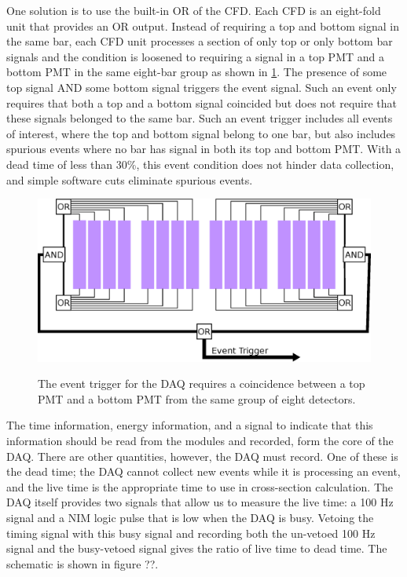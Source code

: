 One solution is to use the built-in OR of the CFD.  Each CFD is an eight-fold unit that provides an OR output.  Instead of requiring a top and bottom signal in the same bar, each CFD unit processes a section of only top or only bottom bar signals and the condition is loosened to requiring a signal in a top PMT and a bottom PMT in the same eight-bar group as shown in \ref{fig:eventTrig}.  The presence of some top signal AND some bottom signal triggers the event signal.  Such an event only requires that both a top and a bottom signal coincided but does not require that these signals belonged to the same bar.  Such an event trigger includes all events of interest, where the top and bottom signal belong to one bar, but also includes spurious events where no bar has signal in both its top and bottom PMT.  With a dead time of less than 30\%, this event condition does not hinder data collection, and simple software cuts eliminate spurious events.

\begin{figure}[htp]
\centering
\includegraphics[width=1.0\textwidth]{figures/event_trigger.eps}
\label{fig:eventTrig}
\caption{The event trigger for the DAQ requires a coincidence between a top PMT and a bottom PMT from the same group of eight detectors.}
\end{figure}

The time information, energy information, and a signal to indicate that this information should be read from the modules and recorded, form the core of the DAQ.  There are other quantities, however, the DAQ must record.  One of these is the dead time; the DAQ cannot collect new events while it is processing an event, and the live time is the appropriate time to use in cross-section calculation.  The DAQ itself provides two signals that allow us to measure the live time: a 100 Hz signal and a NIM logic pulse that is low when the DAQ is busy.  Vetoing the timing signal with this busy signal and recording both the un-vetoed 100 Hz signal and the busy-vetoed signal gives the ratio of live time to dead time.  The schematic is shown in figure ??.

